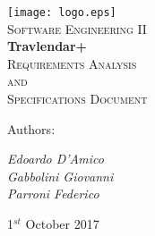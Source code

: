 \documentclass [11pt,a4paper,oneside,openany]{book} %
\begin{document}

\begin{titlepage}

 \begin{center} 
     \texttt{[image: logo.eps]}\\
     \vspace{4em}
     {\Large \textsc{Software Engineering II}}\\
     \vspace{6em}
     {\LARGE \textbf{Travlendar+}}\\
     \vspace{3em}
     {\Large \textsc{Requirements Analysis}}\\
     \vspace{1em}
     {\Large \textsc{and}}\\
     \vspace{1em}
     {\Large \textsc{Specifications Document}}\\
 \end{center}
 
    \vskip 2cm
 
 	Authors:
 	\vspace{0.5em}
 	\begin{center}
      {\Large \textit{Edoardo D'Amico}}\\
      {\Large \textit{Gabbolini Giovanni}}\\
      {\Large \textit{Parroni Federico}}\\
    \end{center}

\vskip 2.0cm
\begin{center}
{\normalsize 1$^{st}$ October 2017}
\end{center}

\end{titlepage}

\newpage

\pagestyle{fancy}
\renewcommand{\chaptername}{Chapter}
\renewcommand{\chaptermark} [1]{\chaptername\ \thechapter.\ #1}{} 
\renewcommand{\chaptermark}[1]{\markboth{\thechapter.\ #1}{}} 
\renewcommand{\sectionmark}[1]{\markright{\thesection\ #1}}
\fancyhf{}
\fancyhead[LE,RO]{\bfseries\thepage} 
\fancyhead[LO,RE]{\bfseries\leftmark} 


\renewcommand{\contentsname}{Indice}
\renewcommand{\listfigurename}{Elenco delle Figure}
\renewcommand{\listtablename}{Elenco delle Tabelle}
\tableofcontents

\linespread{1.5}\selectfont		%


%


\appendix
\end{document}
